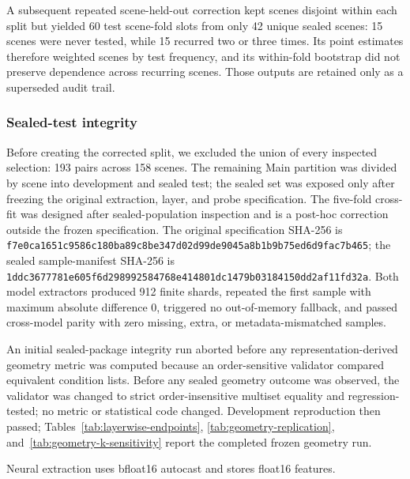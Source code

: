 A subsequent repeated scene-held-out correction kept scenes disjoint within each split but yielded 60 test scene-fold slots from only 42 unique sealed scenes: 15 scenes were never tested, while 15 recurred two or three times. Its point estimates therefore weighted scenes by test frequency, and its within-fold bootstrap did not preserve dependence across recurring scenes. Those outputs are retained only as a superseded audit trail.

\subsubsection{Sealed-test integrity}
\label{app:intphys-sealed-integrity}
Before creating the corrected split, we excluded the union of every inspected selection: 193 pairs across 158 scenes. The remaining Main partition was divided by scene into development and sealed test; the sealed set was exposed only after freezing the original extraction, layer, and probe specification. {\color{black}The five-fold cross-fit was designed after sealed-population inspection and is a post-hoc correction outside the frozen specification.} The original specification SHA-256 is \texttt{f7e0ca1651c9586c\allowbreak 180ba89c8be347d0\allowbreak 2d99de9045a8b1b9\allowbreak b75ed6d9fac7b465}; the sealed sample-manifest SHA-256 is \texttt{1ddc3677781e605f\allowbreak 6d298992584768e4\allowbreak 14801dc1479b0318\allowbreak 4150dd2af11fd32a}. Both model extractors produced 912 finite shards, repeated the first sample with maximum absolute difference 0, triggered no out-of-memory fallback, and passed cross-model parity with zero missing, extra, or metadata-mismatched samples.

{\color{black}An initial sealed-package integrity run aborted before any representation-derived geometry metric was computed because an order-sensitive validator compared equivalent condition lists. Before any sealed geometry outcome was observed, the validator was changed to strict order-insensitive multiset equality and regression-tested; no metric or statistical code changed. Development reproduction then passed; Tables~\ref{tab:layerwise-endpoints}, \ref{tab:geometry-replication}, and~\ref{tab:geometry-k-sensitivity} report the completed frozen geometry run.}

Neural extraction uses bfloat16 autocast and stores float16 features.

